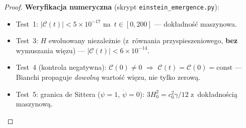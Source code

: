 \begin{proof}
\medskip\noindent
\textbf{Weryfikacja numeryczna} (skrypt \texttt{einstein\_emergence.py}):
\begin{itemize}[nosep]
  \item Test~1: $|\mathcal{C}(t)| < 5 \times 10^{-17}$
        na~$t\in[0,200]$ --- dok\l{}adno\'s\'c maszynowa.
  \item Test~3: $H$ ewoluowany niezale\.znie (z~r\'ownania
        przyspieszeniowego, \textbf{bez} wymuszania wi\k{e}zu)
        --- $|\mathcal{C}(t)| < 6 \times 10^{-14}$.
  \item Test~4 (kontrola negatywna): $\mathcal{C}(0) \neq 0$
        $\Rightarrow$ $\mathcal{C}(t) = \mathcal{C}(0) = \mathrm{const}$
        --- Bianchi propaguje \emph{dowoln\k{a}} warto\'s\'c wi\k{e}zu,
        nie tylko zerow\k{a}.
  \item Test~5: granica de Sittera ($\psi = 1$, $\dot\psi = 0$):
        $3H_0^2 = c_0^2 \gamma/12$ z~dok\l{}adno\'sci\k{a}
        maszynow\k{a}.
\end{itemize}
\end{proof}

